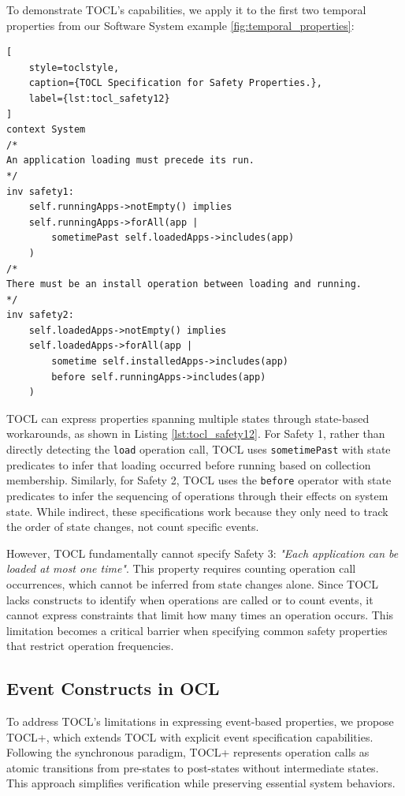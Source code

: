 To demonstrate TOCL's capabilities, we apply it to the first two temporal properties 
from our Software System example \ref{fig:temporal_properties}:

\begin{lstlisting}[
    style=toclstyle, 
    caption={TOCL Specification for Safety Properties.}, 
    label={lst:tocl_safety12}
]
context System 
/*
An application loading must precede its run.
*/
inv safety1: 
    self.runningApps->notEmpty() implies 
    self.runningApps->forAll(app | 
        sometimePast self.loadedApps->includes(app)
    )
/*
There must be an install operation between loading and running.
*/
inv safety2: 
    self.loadedApps->notEmpty() implies 
    self.loadedApps->forAll(app | 
        sometime self.installedApps->includes(app) 
        before self.runningApps->includes(app)
    )
\end{lstlisting}

TOCL can express properties spanning multiple states through state-based workarounds, 
as shown in Listing \ref{lst:tocl_safety12}. For Safety 1, rather than directly 
detecting the \texttt{load} operation call, TOCL uses \texttt{sometimePast} with 
state predicates to infer that loading occurred before running based on collection 
membership. Similarly, for Safety 2, TOCL uses the \texttt{before} operator with 
state predicates to infer the sequencing of operations through their effects on 
system state. While indirect, these specifications work because they only need to 
track the order of state changes, not count specific events.

However, TOCL fundamentally cannot specify Safety 3: \textit{"Each application can 
be loaded at most one time"}. This property requires counting operation call 
occurrences, which cannot be inferred from state changes alone. Since TOCL lacks 
constructs to identify when operations are called or to count events, it cannot 
express constraints that limit how many times an operation occurs. This limitation 
becomes a critical barrier when specifying common safety properties that restrict 
operation frequencies.


\subsection{Event Constructs in OCL}

\hspace{1cm} To address TOCL's limitations in expressing event-based properties, 
we propose TOCL+, which extends TOCL with explicit event specification capabilities. 
Following the synchronous paradigm, TOCL+ represents operation calls as atomic 
transitions from pre-states to post-states without intermediate states. This approach 
simplifies verification while preserving essential system behaviors.

